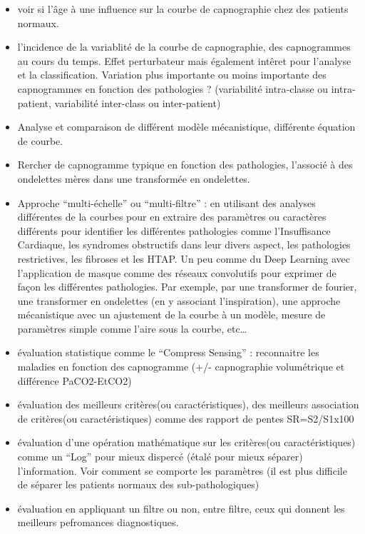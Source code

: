 \documentclass[12pt,]{article}
\begin{document}
\begin{itemize}
\item
  voir si l'âge à une influence sur la courbe de capnographie chez des
  patients normaux.
\item
  l'incidence de la variablité de la courbe de capnographie, des
  capnogrammes au cours du temps. Effet perturbateur mais également
  intêret pour l'analyse et la classification. Variation plus importante
  ou moins importante des capnogrammes en fonction des pathologies ?
  (variabilité intra-classe ou intra-patient, variabilité inter-class ou
  inter-patient)
\item
  Analyse et comparaison de différent modèle mécanistique, différente
  équation de courbe.
\item
  Rercher de capnogramme typique en fonction des pathologies, l'associé
  à des ondelettes mères dans une transformée en ondelettes.
\item
  Approche ``multi-échelle'' ou ``multi-filtre'' : en utilisant des
  analyses différentes de la courbes pour en extraire des paramètres ou
  caractères différents pour identifier les différentes pathologies
  comme l'Insuffisance Cardiaque, les syndromes obstructifs dans leur
  divers aspect, les pathologies restrictives, les fibroses et les HTAP.
  Un peu comme du Deep Learning avec l'application de masque comme des
  réseaux convolutifs pour exprimer de façon les différentes
  pathologies. Par exemple, par une transformer de fourier, une
  transformer en ondelettes (en y associant l'inspiration), une approche
  mécanistique avec un ajustement de la courbe à un modèle, mesure de
  paramètres simple comme l'aire sous la courbe, etc\ldots{}
\item
  évaluation statistique comme le ``Compress Sensing'' : reconnaitre les
  maladies en fonction des capnogramme (+/- capnographie volumétrique et
  différence PaCO2-EtCO2)
\item
  évaluation des meilleurs critères(ou caractéristiques), des meilleurs
  association de critères(ou caractéristiques) comme des rapport de
  pentes SR=S2/S1x100
\item
  évaluation d'une opération mathématique sur les critères(ou
  caractéristiques) comme un ``Log'' pour mieux dispercé (étalé pour
  mieux séparer) l'information. Voir comment se comporte les paramètres
  (il est plus difficile de séparer les patients normaux des
  sub-pathologiques)
\item
  évaluation en appliquant un filtre ou non, entre filtre, ceux qui
  donnent les meilleurs pefromances diagnostiques.

\end{itemize}
\end{document}
